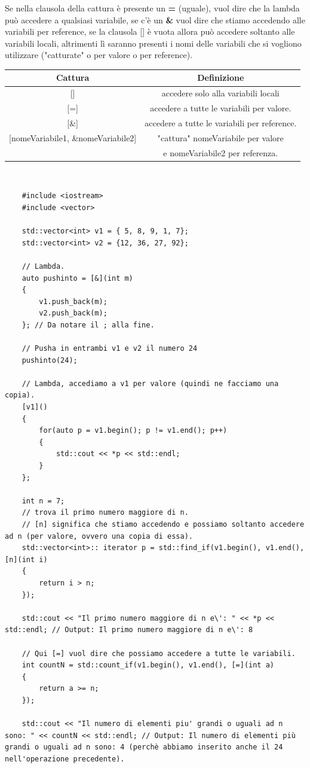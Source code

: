 \textsf{\small Se nella clausola della cattura è presente un \textbf{=} (uguale), vuol dire che la lambda può accedere a qualsiasi variabile, se c'è un \textbf{\&} vuol dire che stiamo accedendo alle variabili per reference, se la clausola [] è vuota allora può accedere soltanto alle variabili locali, altrimenti lì saranno presenti i nomi delle variabili che si vogliono utilizzare ("catturate" o per valore o per reference).} \\ %

\begin{tabular}{|c|c|}
	\hline
	\textbf{Cattura} & \textbf{Definizione} \\
	\hline
	\textsf{\small []} & \textsf{\small accedere solo alla variabili locali} \\
	\hline
	\textsf{\small [=]} & \textsf{\small accedere a tutte le variabili per valore.} \\
	\hline
	\textsf{\small [\&]} & \textsf{\small accedere a tutte le variabili per reference.} \\
	\hline
	\textsf{\small [nomeVariabile1, \&nomeVariabile2]} & \textsf{\small "cattura" nomeVariabile per valore } \\
	\textsf{\small } & \textsf{\small e nomeVariabile2 per referenza.} \\
	\hline
\end{tabular} \\

\begin{lstlisting}
	#include <iostream>
	#include <vector>
	
	std::vector<int> v1 = { 5, 8, 9, 1, 7};
	std::vector<int> v2 = {12, 36, 27, 92};
	
	// Lambda.
	auto pushinto = [&](int m)
	{
		v1.push_back(m);
		v2.push_back(m);
	}; // Da notare il ; alla fine.

	// Pusha in entrambi v1 e v2 il numero 24
	pushinto(24);
	
	// Lambda, accediamo a v1 per valore (quindi ne facciamo una copia).
	[v1]()
	{
		for(auto p = v1.begin(); p != v1.end(); p++)
		{
			std::cout << *p << std::endl;
		}
	};

	int n = 7;
	// trova il primo numero maggiore di n.
	// [n] significa che stiamo accedendo e possiamo soltanto accedere ad n (per valore, ovvero una copia di essa).
	std::vector<int>:: iterator p = std::find_if(v1.begin(), v1.end(), [n](int i)
	{
		return i > n;
	});

	std::cout << "Il primo numero maggiore di n e\': " << *p << std::endl; // Output: Il primo numero maggiore di n e\': 8

	// Qui [=] vuol dire che possiamo accedere a tutte le variabili.
	int countN = std::count_if(v1.begin(), v1.end(), [=](int a) 
	{
		return a >= n;
	});

	std::cout << "Il numero di elementi piu' grandi o uguali ad n sono: " << countN << std::endl; // Output: Il numero di elementi più grandi o uguali ad n sono: 4 (perchè abbiamo inserito anche il 24 nell'operazione precedente).
\end{lstlisting}

